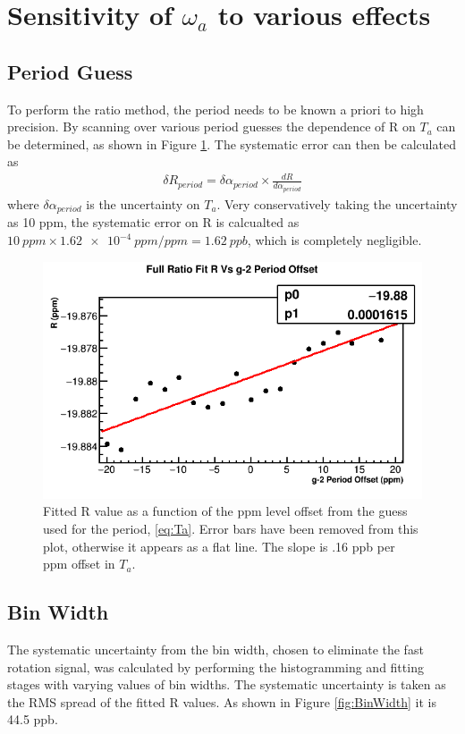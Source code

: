\section{Sensitivity of \texorpdfstring{$\omega_{a}$}{} to various effects}

	\subsection{\gmtwo Period Guess}

		To perform the ratio method, the \gmtwo period needs to be known a priori to high precision. By scanning over various \gmtwo period guesses the dependence of R on $T_{a}$ can be determined, as shown in Figure \ref{fig:gm2PeriodGuess}. The systematic error can then be calculated as 
			\begin{align}
				\delta R_{period} = \delta\alpha_{period} \times \frac{dR}{d\alpha_{period}}
			\end{align}
		where $\delta\alpha_{period}$ is the uncertainty on $T_{a}$. Very conservatively taking the uncertainty as 10 ppm, the systematic error on R is calcualted as $\SI{10}{ppm} \times \SI{1.62e-4}{ppm/ppm} = \SI{1.62}{ppb}$, which is completely negligible.

		\begin{figure}[]
			\centering
			\includegraphics[width=.6\textwidth]{RatioCBO_R_Vs_gm2PeriodGuess_Canv}
		    \caption[gm2PeriodGuess]{Fitted R value as a function of the ppm level offset from the guess used for the \gmtwo period, \ref{eq:Ta}. Error bars have been removed from this plot, otherwise it appears as a flat line. The slope is .16 ppb per ppm offset in $T_{a}$.}
		    \label{fig:gm2PeriodGuess}
		\end{figure}


	\subsection{Bin Width}

		The systematic uncertainty from the bin width, chosen to eliminate the fast rotation signal, was calculated by performing the histogramming and fitting stages with varying values of bin widths. The systematic uncertainty is taken as the RMS spread of the fitted R values. As shown in Figure \ref{fig:BinWidth} it is 44.5 ppb.

